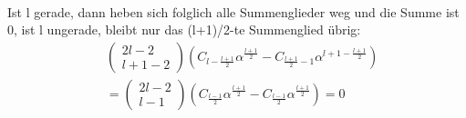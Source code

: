\documentclass[a4paper, 11pt]{scrreprt}
\begin{document}
\begin{itemize}
\begin{align*}
\end{align*}
Ist l gerade, dann heben sich folglich alle Summenglieder weg und die Summe ist 0, ist l ungerade, bleibt nur das (l+1)/2-te Summenglied übrig:
\begin{align*}
 &\begin{pmatrix} 2l-2\\l+1-2\end{pmatrix} \left( C_{l-\frac{l+1}{2}} \alpha^{\frac{l+1}{2}} - C_{\frac{l+1}{2} -1}\alpha^{l+1-\frac{l+1}{2}} \right)\\
&=\begin{pmatrix} 2l-2\\l-1\end{pmatrix} \left( C_{\frac{l-1}{2}} \alpha^{\frac{l+1}{2}} - C_{\frac{l-1}{2}}\alpha^{\frac{l+1}{2}} \right)=0
\end{align*}


\end{itemize}
\end{document}
